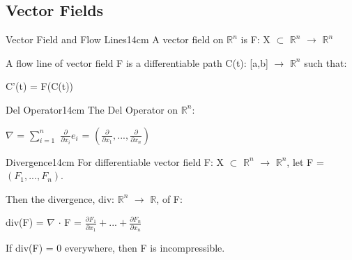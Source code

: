     \vspace{0.5cm}





\subsection{ Vector Fields }

    \begin{definition}{Vector Field and Flow Lines}{14cm}
        A {\color{lblue} vector field} on $\mathbb{R}^n$ is
        F: X $\subset$ $\mathbb{R}^n$ $\rightarrow$ $\mathbb{R}^n$

        \vspace{0.5cm}

        A {\color{lblue} flow line} of vector field F
        is a differentiable path C(t): [a,b] $\rightarrow$ $\mathbb{R}^n$
        such that:

        \hspace{0.5cm}
        C'(t) = F(C(t))
    \end{definition}

    \vspace{0.5cm}



    \begin{definition}{Del Operator}{14cm}
        The {\color{lblue} Del Operator} on $\mathbb{R}^n$:
        
        \hspace{0.5cm}
        $\nabla$ = $\sum_{i=1}^n$ $\frac{\partial}{\partial x_i}e_i$
        = $(\frac{\partial}{\partial x_1},...,\frac{\partial}{\partial x_n})$
    \end{definition}

    \newpage



    \begin{definition}{Divergence}{14cm}
        For differentiable vector field F: X $\subset$ $\mathbb{R}^n$
        $\rightarrow$ $\mathbb{R}^n$, let F = $(F_1,...,F_n)$.

        Then the {\color{lblue} divergence}, div:
        $\mathbb{R}^n$ $\rightarrow$ $\mathbb{R}$, of F:

        \hspace{0.5cm}
        div(F)
        = $\nabla$ $\cdot$ F
        = $\frac{\partial F_1}{\partial x_1}
                + ... + \frac{\partial F_n}{\partial x_n}$

        If div(F) = 0 everywhere, then F is incompressible.
    \end{definition}

